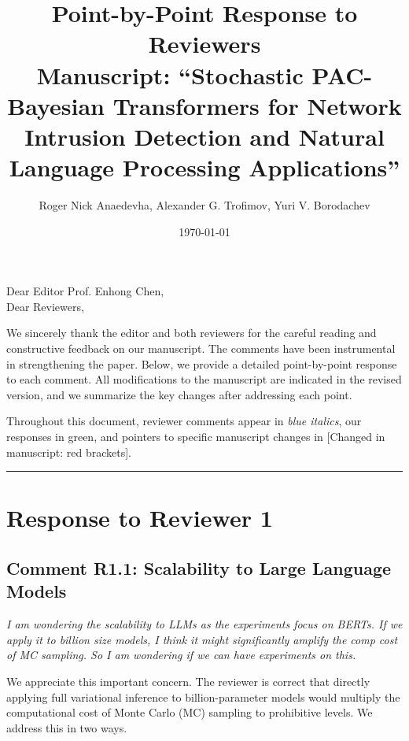 \documentclass[12pt,a4paper]{article}
\newcommand{\reviewertext}[1]{\textcolor{reviewercolor}{\textit{#1}}}
\newcommand{\response}[1]{\textcolor{responsecolor}{#1}}
\newcommand{\changed}[1]{\textcolor{changecolor}{[Changed in manuscript: #1]}}
\begin{document}
\title{Point-by-Point Response to Reviewers\\[6pt]
\large Manuscript: ``Stochastic PAC-Bayesian Transformers for Network\\
Intrusion Detection and Natural Language Processing Applications''}

\author{Roger Nick Anaedevha, Alexander G. Trofimov, Yuri V. Borodachev}

\date{\today}
\maketitle

\noindent Dear Editor Prof. Enhong Chen,\\[6pt]
Dear Reviewers,

\bigskip

We sincerely thank the editor and both reviewers for the careful reading and constructive feedback on our manuscript. The comments have been instrumental in strengthening the paper. Below, we provide a detailed point-by-point response to each comment. All modifications to the manuscript are indicated in the revised version, and we summarize the key changes after addressing each point.

Throughout this document, reviewer comments appear in \reviewertext{blue italics}, our responses in \response{green}, and pointers to specific manuscript changes in \changed{red brackets}.

\bigskip
\hrule
\bigskip

\section*{Response to Reviewer 1}

\subsection*{Comment R1.1: Scalability to Large Language Models}

\reviewertext{I am wondering the scalability to LLMs as the experiments focus on BERTs. If we apply it to billion size models, I think it might significantly amplify the comp cost of MC sampling. So I am wondering if we can have experiments on this.}

\bigskip

\response{We appreciate this important concern. The reviewer is correct that directly applying full variational inference to billion-parameter models would multiply the computational cost of Monte Carlo (MC) sampling to prohibitive levels. We address this in two ways.}
\end{document}
